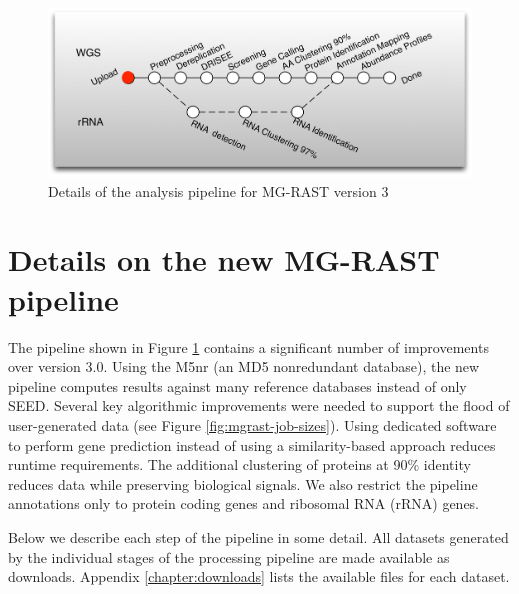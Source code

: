 \documentclass[12pt,fullpage]{report}
\begin{document}
\begin{figure}
\begin{center}
\includegraphics[width=6in]{Images/mgrastv3pipeline.png}
\end{center}
\caption{
Details of the analysis pipeline for MG-RAST version 3}
\label{fig:mgrast-v3-pipeline}
\end{figure}

\section{Details on the new MG-RAST pipeline}
\label{section:mgrast_pipeline_details}
The pipeline shown in Figure \ref{fig:mgrast-v3-pipeline} contains a significant number of improvements over version 3.0.
Using the M5nr \cite{M5NR} (an MD5 nonredundant database), the new pipeline computes results against many reference databases instead of only \gls{SEED}.
Several key algorithmic improvements were needed to support the flood of user-generated data (see Figure \ref{fig:mgrast-job-sizes}). Using dedicated software to perform gene prediction instead of using a similarity-based approach reduces runtime requirements. The additional clustering of proteins at 90\% identity reduces data while preserving biological signals.
We also restrict the pipeline annotations only to protein coding genes and ribosomal RNA (\gls{rRNA}) genes.

Below we describe each step of the pipeline in some detail. All datasets generated by the individual stages of the processing pipeline are made available as downloads. Appendix \ref{chapter:downloads} lists the available files for each dataset.
\end{document}
